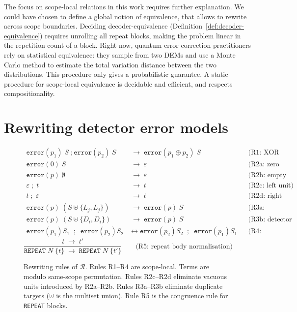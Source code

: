 \documentclass[11pt,a4paper]{article}
\newcommand{\xorfold}{\oplus}          %
\newcommand{\tostep}{\to}
\begin{document}
The focus on scope-local relations in this work requires further explanation. We could have chosen to define a global notion of equivalence, that allows to rewrite across scope boundaries. Deciding decoder-equivalence (Definition~\ref{def:decoder-equivalence}) requires unrolling all repeat blocks, making the problem linear in the repetition count of a block. Right now, quantum error correction practitioners rely on statistical equivalence: they sample from two DEMs and use a Monte Carlo method to estimate the total variation distance between the two distributions. This procedure only gives a probabilistic guarantee. A static procedure for scope-local equivalence is decidable and efficient, and respects compositionality.

\section{Rewriting detector error models}
\label{sec:rules}

\begin{figure}[t]
\centering
\begin{align*}
  \mathtt{error}(p_1)\;S \;; \mathtt{error}(p_2)\;S
    &\;\tostep\; \mathtt{error}(p_1 \xorfold p_2)\;S
    &&\text{(R1: XOR fusion)}\\[6pt]
  \mathtt{error}(0)\;S
    &\;\tostep\; \varepsilon
    &&\text{(R2a: zero probability)}\\[6pt]
  \mathtt{error}(p)\;\emptyset
    &\;\tostep\; \varepsilon
    &&\text{(R2b: empty targets)}\\[6pt]
  \varepsilon \;; \; t
    &\;\tostep\; t
    &&\text{(R2c: left unit)}\\[6pt]
  t \;; \; \varepsilon
    &\;\tostep\; t
    &&\text{(R2d: right unit)}\\[6pt]
  \mathtt{error}(p)\;(S \uplus \{L_j, L_j\})
    &\;\tostep\; \mathtt{error}(p)\;S
    &&\text{(R3a: observable cancellation)}\\[6pt]
  \mathtt{error}(p)\;(S \uplus \{D_i, D_i\})
    &\;\tostep\; \mathtt{error}(p)\;S
    &&\text{(R3b: detector cancellation)}\\[6pt]
  \mathtt{error}(p_1) S_1 \;\;;\;\; \mathtt{error}(p_2) S_2
    &\leftrightarrow \mathtt{error}(p_2) S_2 \;\;;\;\; \mathtt{error}(p_1) S_1
    &&\text{(R4: commutativity)}
\end{align*}
\[
  \frac{\displaystyle t \;\tostep\; t'}
       {\mathtt{REPEAT}\;N\;\{t\} \;\tostep\; \mathtt{REPEAT}\;N\;\{t'\}}
  \qquad\text{(R5: repeat body normalisation)}
\]
\caption{Rewriting rules of $\mathcal{R}$. Rules R1--R4 are
  scope-local. Terms are modulo same-scope permutation.
  Rules R2c--R2d eliminate vacuous units introduced by R2a--R2b.
  Rules R3a--R3b eliminate duplicate targets ($\uplus$ is the multiset union).
  Rule R5 is the congruence rule for \texttt{REPEAT} blocks.}
\label{fig:rules}
\end{figure}
\end{document}

